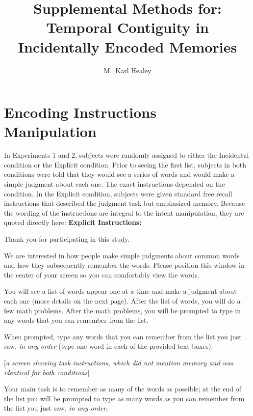 \documentclass[man,natbib,floatsintext]{apa6} %
\title{Supplemental Methods for: Temporal Contiguity in Incidentally Encoded Memories}
\author{M.\ Karl Healey}
\affiliation{Michigan State University}
\begin{document}
\maketitle

\newcommand\listlength{16} %
\newcommand\presrate{4 seconds} %
\newcommand\isi{1 second} %
\newcommand\DFRDelay{16 seconds} %
\newcommand\recalltime{75 seconds} %
\newcommand\totalss{XX}
\newcommand\totalexcluded{XX}

\section{Encoding Instructions Manipulation} In Experiments 1 and 2, subjects were randomly assigned to either the Incidental condition or the Explicit condition. Prior to seeing the first list, subjects in both conditions were told that they would see a series of words and would make a simple judgment about each one. The exact instructions depended on the condition. In the Explicit condition, subjects were given standard free recall instructions that described the judgment task but emphasized memory. Because the wording of the instructions are integral to the intent manipulation, they are quoted directly here:
\textbf{Explicit Instructions:}

\begin{displayquote}
        Thank you for participating in this study. 

        We are interested in how people make simple judgments about common words and
        how they subsequently remember the words. Please position this window in the center
        of your screen so you can comfortably view the words.

        You will see a list of words appear one at a time and make a judgment about each one
        (more details on the next page). After the list of words, you will do a few math problems.
        After the math problems, you will be prompted to type in any words that you can remember
        from the list.

        When prompted, type any words that you can remember from the list you just saw,
        \emph{in any order} (type one word in each of the provided text boxes).

    [\textit{a screen showing task instructions, which did not mention memory and was identical for both conditions}]

        Your main task is to remember as many of the words as possible; at the end of the list you will be prompted to
    type as many words as you can remember from the list you just saw, \emph{in any order}.
\end{displayquote}
\end{document}
